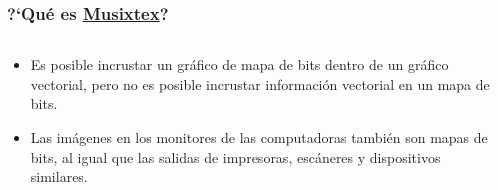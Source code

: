 \documentclass[aspectratio=169]{beamer}
\begin{document}
\begin{frame}[t]
\frametitle{?`Qué es \underline{Musixtex}?}
\centering
\begin{columns}
        \begin{column}{0.45\linewidth}
        \pause
        \begin{itemize}[<+->]     
        \item Es posible incrustar un gráfico de mapa de bits dentro 
            de un gráfico vectorial, pero no es posible incrustar información 
            vectorial en un mapa de bits.
        \item Las imágenes en los monitores de las computadoras también son 
            mapas de bits, al igual que las salidas de impresoras, escáneres y 
            dispositivos similares.
            \end{itemize}
\end{column}
\begin{column}{0.45\linewidth}
    \vspace*{-0.35cm}
    \begin{center}
    \end{center}
        \end{column}
    \end{columns}   
\end{frame}
\end{document}

